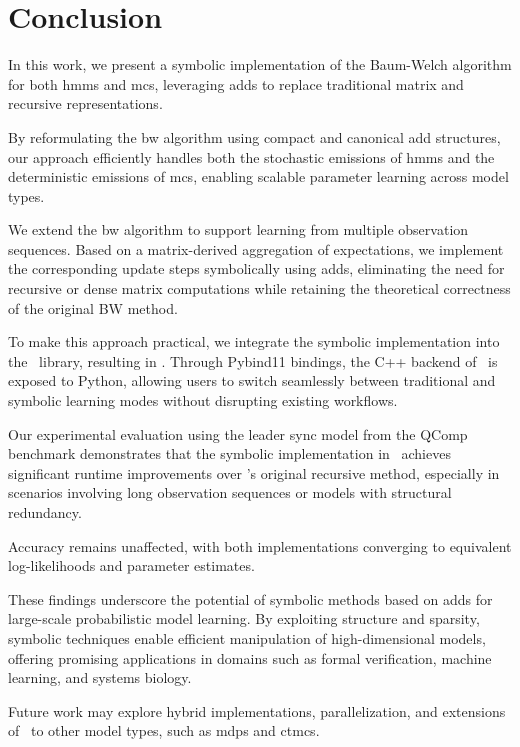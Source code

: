 \section{Conclusion}\label{sec:conclusion}
In this work, we present a symbolic implementation of the Baum-Welch algorithm for both \glspl{hmm} and \glspl{mc}, leveraging \glspl{add} to replace traditional matrix and recursive representations.

By reformulating the \gls{bw} algorithm using compact and canonical \gls{add} structures, our approach efficiently handles both the stochastic emissions of \glspl{hmm} and the deterministic emissions of \glspl{mc}, enabling scalable parameter learning across model types.

We extend the \gls{bw} algorithm to support learning from multiple observation sequences.
Based on a matrix-derived aggregation of expectations, we implement the corresponding update steps symbolically using \glspl{add}, eliminating the need for recursive or dense matrix computations while retaining the theoretical correctness of the original BW method.

To make this approach practical, we integrate the symbolic implementation into the \Jajapy\ library, resulting in \JajapyTwo. Through Pybind11 bindings, the C++ backend of \Cupaal\ is exposed to Python, allowing users to switch seamlessly between traditional and symbolic learning modes without disrupting existing workflows.

Our experimental evaluation using the leader sync model from the QComp benchmark demonstrates that the symbolic implementation in \Cupaal\ achieves significant runtime improvements over \Jajapy's original recursive method, especially in scenarios involving long observation sequences or models with structural redundancy.

Accuracy remains unaffected, with both implementations converging to equivalent log-likelihoods and parameter estimates.

These findings underscore the potential of symbolic methods based on \glspl{add} for large-scale probabilistic model learning.
By exploiting structure and sparsity, symbolic techniques enable efficient manipulation of high-dimensional models, offering promising applications in domains such as formal verification, machine learning, and systems biology.

Future work may explore hybrid implementations, parallelization, and extensions of \Cupaal\ to other model types, such as \glspl{mdp} and \glspl{ctmc}.
